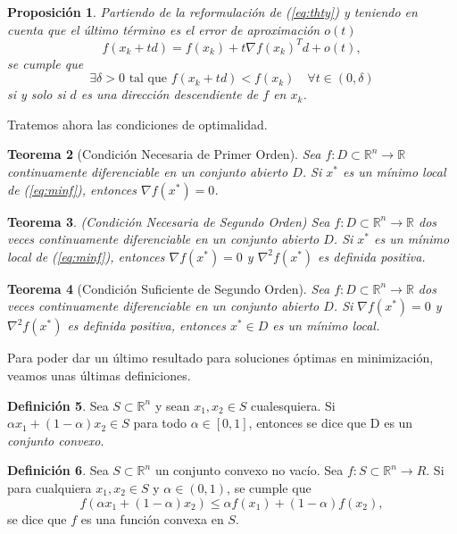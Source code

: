 \documentclass[11pt,a4paper]{book}
\newtheorem{theorem}{Teorema}[chapter]
\newtheorem{proposition}[theorem]{Proposición}
\theoremstyle{definition}
\newtheorem{definition}[theorem]{Definición}
\theoremstyle{remark}
\begin{document}
\begin{proposition}
Partiendo de la reformulación de (\ref{eq:thty}) y teniendo en cuenta que el último término es el error de aproximación $o(t)$
\begin{equation}
	f(x_k + td) = f(x_k) + t \nabla f(x_k)^Td + o(t),
\end{equation}
se cumple que
\begin{equation}
	\exists \delta > 0 \text{ tal que } f(x_k + td) < f(x_k)
	\quad \forall t \in (0, \delta)
\end{equation}
si y solo si $d$ es una dirección descendiente de $f$ en $x_k$.

\end{proposition}

Tratemos ahora las condiciones de optimalidad.

\begin{theorem}[Condición Necesaria de Primer Orden]
	Sea $f:D\subset \mathbb{R}^n \rightarrow \mathbb{R}$ continuamente diferenciable en un conjunto abierto $D$. Si $x^*$ es un mínimo local de (\ref{eq:minf}), entonces $\nabla f(x^*) = 0$.
\end{theorem}

\begin{theorem}
	(Condición Necesaria de Segundo Orden)
	Sea $f:D\subset \mathbb{R}^n \rightarrow \mathbb{R}$ dos veces continuamente diferenciable en un conjunto abierto $D$. Si $x^*$ es un mínimo local de (\ref{eq:minf}), entonces $\nabla f(x^*) = 0$ y $\nabla^2 f(x^*)$ es definida positiva.
\end{theorem}

\begin{theorem}[Condición Suficiente de Segundo Orden]
	Sea $f:D\subset \mathbb{R}^n \rightarrow \mathbb{R}$ dos veces continuamente diferenciable en un conjunto abierto $D$. Si $\nabla f(x^*) = 0$ y $\nabla^2 f(x^*)$ es definida positiva, entonces $x^* \in D$ es un mínimo local.
\end{theorem}

Para poder dar un último resultado para soluciones óptimas en minimización, veamos unas últimas definiciones.

\begin{definition}
	Sea $S\subset \mathbb{R}^n$ y sean $x_1, x_2 \in S$ cualesquiera. Si
	$\alpha x_1 + (1 - \alpha)x_2 \in S$ para todo $\alpha \in [0,1]$, entonces se dice que D es un \textit{conjunto convexo}.
\end{definition}
\begin{definition}
	Sea $S \subset \mathbb{R}^n$ un conjunto convexo no vacío. Sea $f: S \subset \mathbb{R}^n \rightarrow R$. Si para cualquiera $x_1, x_2 \in S$ y
	$\alpha \in (0,1)$, se cumple que
	\begin{equation}
		f(\alpha x_1 + (1-\alpha)x_2) \leq \alpha f(x_1) + (1-\alpha)f(x_2),
	\end{equation}
	se dice que $f$ es una función convexa en $S$.
\end{definition}
\end{document}
